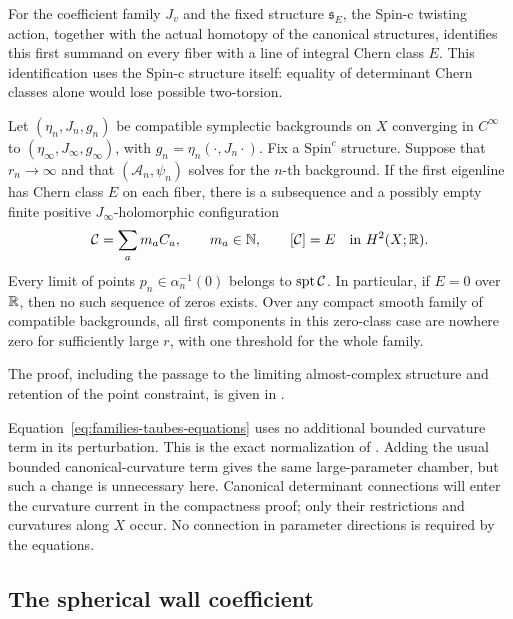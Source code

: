 For the coefficient family \(J_v\) and the fixed structure
\(\mathfrak s_E\), the Spin-c twisting action, together with the
actual homotopy of the canonical structures, identifies this first
summand on every fiber with a line of integral Chern class \(E\).
This identification uses the Spin-c structure itself: equality of
determinant Chern classes alone would lose possible two-torsion.

\begin{lemma}
 \label{lem:families-taubes-compactness}
 Let \((\eta_n,J_n,g_n)\) be compatible symplectic backgrounds on
 \(X\) converging in \(C^\infty\) to
 \((\eta_\infty,J_\infty,g_\infty)\), with
 \(g_n=\eta_n(\cdot,J_n\cdot)\).  Fix a
 \(\mathrm{Spin}^c\) structure.  Suppose that
 \(r_n\to\infty\) and that \((\mathcal A_n,\psi_n)\) solves
  for the \(n\)-th background.
 If the first eigenline has Chern class \(E\) on each fiber, there
 is a subsequence and a possibly empty finite positive
 \(J_\infty\)-holomorphic configuration
 \[
  \mathcal C=\sum_a m_a C_a,\qquad m_a\in\mathbb N,
  \qquad [\mathcal C]=E\quad\text{in }H^2(X;\mathbb R).
 \]
 Every limit of points \(p_n\in\alpha_n^{-1}(0)\) belongs to
 \(\operatorname{spt}\mathcal C\).  In particular, if \(E=0\) over \(\mathbb R\),
 then no such sequence of zeros exists.  Over any compact smooth
 family of compatible backgrounds, all first components in this
 zero-class case are nowhere zero for sufficiently large \(r\),
 with one threshold for the whole family.
\end{lemma}

The proof, including the passage to the limiting almost-complex structure
and retention of the point constraint, is given in
.

\begin{remark}
 \label{rem:families-exact-equations}
Equation~\eqref{eq:families-taubes-equations} uses no additional
bounded curvature term in its perturbation.  This is the exact
normalization of \cite[Theorem~2.2]{Taubes1999}.  Adding the usual bounded
canonical-curvature term gives the same large-parameter chamber,
but such a change is unnecessary here.  Canonical determinant
connections will enter the curvature current in the compactness proof;
only their restrictions and curvatures along \(X\) occur.  No
connection in parameter directions is required by the equations.
\end{remark}

\subsection{The spherical wall coefficient}

